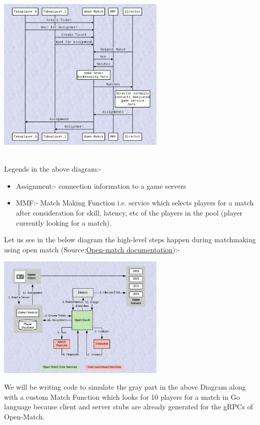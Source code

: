 \documentclass[12pt, letter]{article}
\begin{document}
\centerline{
   \includegraphics[width=0.6\textwidth]{images/DemoFlow.png}
}
\\

Legends in the above diagram:-
\begin{itemize}
  \item Assignment:- connection information to a game servers

  \item MMF:- Match Making Function i.e. service which selects players for a match after consideration for skill, latency, etc of the players in the pool (player currently looking for a match).
\end{itemize}

Let us see in the below diagram the high-level steps happen during matchmaking using open match (Source:\href{https://open-match.dev/site/docs/}{Open-match documentation}):-

\centerline{
   \includegraphics[width=0.6\textwidth]{images/DemoSteps.png}
}

We will be writing code to simulate the gray part in the above Diagram along with a custom Match Function which looks for 10 players for a match in Go language because client and server stubs are already generated for the gRPCs of Open-Match.
\end{document}
